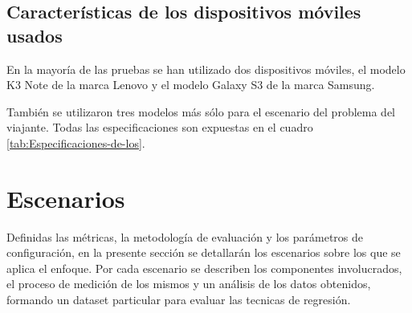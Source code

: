 \subsection{Características de los dispositivos móviles usados\label{subsec:Caracter=0000EDsticas-de-los}}

En la mayoría de las pruebas se han utilizado dos dispositivos móviles,
el modelo K3 Note de la marca Lenovo y el modelo Galaxy S3 de la marca
Samsung.

También se utilizaron tres modelos más sólo para el escenario del
problema del viajante. Todas las especificaciones son expuestas en
el cuadro \ref{tab:Especificaciones-de-los}. 

\begin{table}[H]

\caption{Especificaciones de los dispositivos móviles utilizados. \label{tab:Especificaciones-de-los}}
\end{table}



\section{Escenarios\label{sec:Escenarios}}

Definidas las métricas, la metodología de evaluación y los parámetros
de configuración, en la presente sección se detallarán los escenarios
sobre los que se aplica el enfoque. Por cada escenario se describen
los componentes involucrados, el proceso de medición de los mismos
y un análisis de los datos obtenidos, formando un dataset particular
para evaluar las tecnicas de regresión. 


